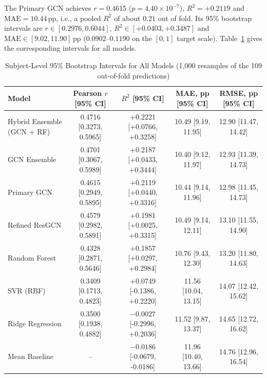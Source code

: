 \documentclass{ieeeaccess}
\newcommand{\pp}{\,\text{pp}}
\begin{document}
The Primary GCN achieves $r=0.4615$ ($p=4.40\times10^{-7}$), $R^2=+0.2119$ and $\text{MAE}=10.44\pp$, i.e., a pooled $R^2$ of about $0.21$ out of fold. Its 95\% bootstrap intervals are $r\in[0.2976,0.6044]$, $R^2\in[+0.0403,+0.3487]$ and $\text{MAE}\in[9.02,11.90]\pp$ ($0.0902$--$0.1190$ on the $[0,1]$ target scale). Table~\ref{tab:ci} gives the corresponding intervals for all models.

\begin{table}[!t]
\caption{Subject-Level 95\% Bootstrap Intervals for All Models (1,000 resamples of the 109 out-of-fold predictions)}
\label{tab:ci}
\centering
\scriptsize
\begin{tabular}{lcccc}
\toprule
\textbf{Model} & \textbf{Pearson $r$ [95\% CI]} & \textbf{$R^2$ [95\% CI]} & \textbf{MAE, pp [95\% CI]} & \textbf{RMSE, pp [95\% CI]}\\
\midrule
Hybrid Ensemble (GCN + RF) & 0.4716 [0.3273, 0.5965] & +0.2221 [+0.0766, +0.3258] & 10.49 [9.19, 11.95] & 12.90 [11.47, 14.42]\\
GCN Ensemble & 0.4701 [0.3067, 0.5989] & +0.2187 [+0.0433, +0.3444] & 10.40 [9.12, 11.97] & 12.93 [11.39, 14.73]\\
Primary GCN & 0.4615 [0.2949, 0.5895] & +0.2119 [+0.0440, +0.3316] & 10.44 [9.14, 11.96] & 12.98 [11.45, 14.73]\\
Refined ResGCN & 0.4579 [0.2982, 0.5891] & +0.1981 [+0.0025, +0.3315] & 10.49 [9.14, 12.11] & 13.10 [11.55, 14.90]\\
Random Forest & 0.4328 [0.2871, 0.5646] & +0.1857 [+0.0297, +0.2984] & 10.76 [9.43, 12.30] & 13.20 [11.80, 14.63]\\
SVR (RBF) & 0.3409 [0.1713, 0.4823] & +0.0749 [-0.1386, +0.2220] & 11.56 [10.04, 13.15] & 14.07 [12.42, 15.62]\\
Ridge Regression & 0.3500 [0.1938, 0.4882] & $-0.0027$ [-0.2996, +0.2036] & 11.52 [9.87, 13.37] & 14.65 [12.72, 16.62]\\
Mean Baseline & -- & $-0.0186$ [-0.0679, -0.0186] & 11.96 [10.40, 13.66] & 14.76 [12.96, 16.54]\\
\bottomrule
\end{tabular}
\end{table}
\end{document}
